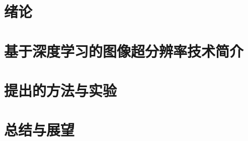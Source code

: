 \documentclass{xduugthesis}
\begin{document}
\chapter{绪论}

\chapter{基于深度学习的图像超分辨率技术简介}

\chapter{提出的方法与实验}

\chapter{总结与展望}

\end{document}
